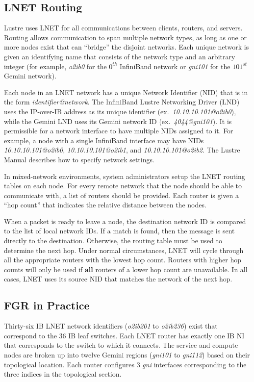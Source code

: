 \subsection{LNET Routing}

Lustre uses LNET for all communications between clients, routers, and servers.
Routing allows communication to span multiple network types, as long as one or
more nodes exist that can ``bridge'' the disjoint networks.  Each unique
network is given an identifying name that consists of the network type and an
arbitrary integer (for example, \textit{o2ib0} for the $0^{th}$ InfiniBand
network or \textit{gni101} for the $101^{st}$ Gemini network).

Each node in an LNET network has a unique Network Identifier (NID) that is in
the form \textit{identifier@network}.  The InfiniBand Lustre Networking Driver
(LND) uses the IP-over-IB address as its unique identifier
(ex.~\textit{10.10.10.101@o2ib0}), while the Gemini LND uses its Gemini
network ID (ex.~\textit{4044@gni101}).  It is permissible for a network
interface to have multiple NIDs assigned to it.  For example, a node with a
single InfiniBand interface may have NIDs \textit{10.10.10.101@o2ib0},
\textit{10.10.10.101@o2ib1}, and \textit{10.10.10.101@o2ib2}.  The Lustre
Manual \cite{lustre-manual} describes how to specify network settings.

In mixed-network environments, system administrators setup the LNET routing
tables on each node.  For every remote network that the node should be able to
communicate with, a list of routers should be provided.  Each router is given a
``hop count'' that indicates the relative distance between the nodes.

When a packet is ready to leave a node, the destination network ID is compared
to the list of local network IDs.  If a match is found, then the message is
sent directly to the destination.  Otherwise, the routing table must be used to
determine the next hop.  Under normal circumstances, LNET will cycle through
all the appropriate routers with the lowest hop count.  Routers with higher hop
counts will only be used if \textbf{all} routers of a lower hop count are
unavailable.  In all cases, LNET uses its source NID that matches the network
of the next hop.

\subsection{FGR in Practice}

Thirty-six IB LNET network identifiers (\textit{o2ib201} to \textit{o2ib236})
exist that correspond to the 36 IB leaf switches. Each LNET router has exactly
one IB NI that corresponds to the switch to which it connects.  The service and
compute nodes are broken up into twelve Gemini regions (\textit{gni101} to
\textit{gni112}) based on their topological location.  Each router configures 3
\textit{gni} interfaces corresponding to the three indices in the topological
section.

